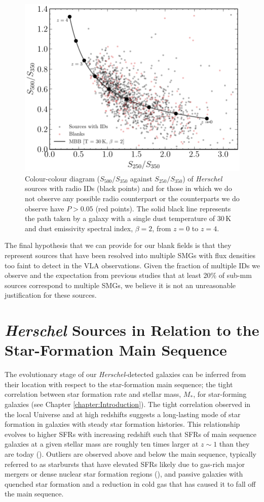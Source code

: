 \begin{figure}
	\centering
	\includegraphics[width=0.75\columnwidth]{Figures/blank_fir_colours.pdf}
	\caption{Colour-colour diagram ($S_{500}/S_{350}$ against $S_{250}/S_{350}$) of \textit{Herschel} sources with radio IDs (black points) and for those in which we do not observe any possible radio counterpart or the counterparts we do observe have $P > 0.05$ (red points). The solid black line represents the path taken by a galaxy with a single dust temperature of $30\,$K and dust emissivity spectral index, $\beta = 2$, from $z = 0$ to $z = 4$.}
	\label{fig:blank_fir_colours}
\end{figure}

The final hypothesis that we can provide for our blank fields is that they represent sources that have been resolved into multiple SMGs with flux densities too faint to detect in the VLA observations. Given the fraction of multiple IDs we observe and the expectation from previous studies that at least 20\% of sub-mm sources correspond to multiple SMGs, we believe it is not an unreasonable justification for these sources.

\section{\textit{Herschel} Sources in Relation to the Star-Formation Main Sequence}

The evolutionary stage of our \textit{Herschel}-detected galaxies can be inferred from their location with respect to the star-formation main sequence; the tight correlation between star formation rate and stellar mass, $M_*$, for star-forming galaxies (see Chapter \ref{chapter:Introduction}). The tight correlation observed in the local Universe and at high redshifts suggests a long-lasting mode of star formation in galaxies with steady star formation histories. This relationship evolves to higher SFRs with increasing redshift such that SFRs of main sequence galaxies at a given stellar mass are roughly ten times larger at $z\sim1$ than they are today (\citealt{Noeske_2007}). Outliers are observed above and below the main sequence, typically referred to as starbursts that have elevated SFRs likely due to gas-rich major mergers or dense nuclear star formation regions (\citealt{Daddi_2010}), and passive galaxies with quenched star formation and a reduction in cold gas that has caused it to fall off the main sequence. 

